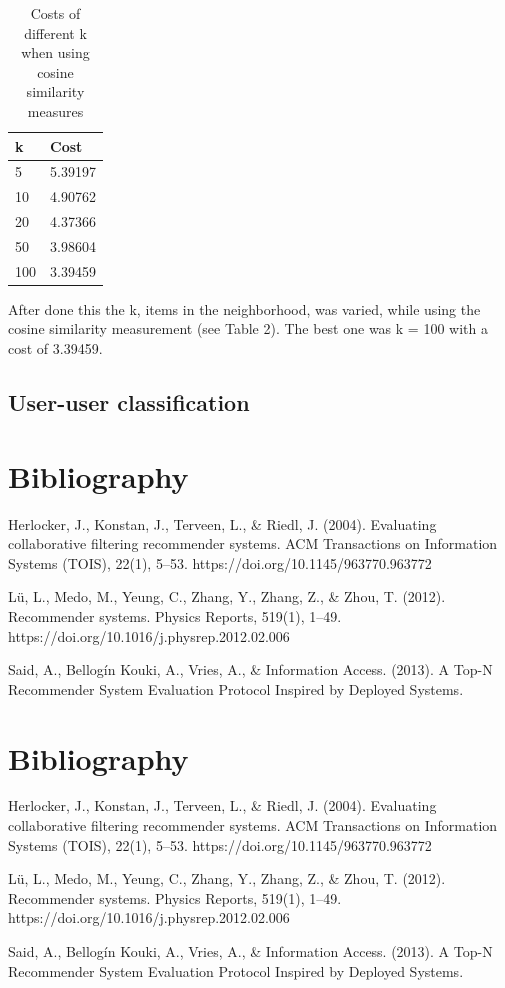 \documentclass[11pt]{article}
\begin{document}
\begin{table}[]
\begin{tabular}{@{}ll@{}}
\toprule
k   & Cost    \\ \midrule
5   & 5.39197 \\
10  & 4.90762 \\
20  & 4.37366 \\
50  & 3.98604 \\
100 & 3.39459 \\ \bottomrule
\end{tabular}
\caption{Costs of different k when using cosine similarity measures}
\end{table}

After done this the k, items in the neighborhood, was varied, while using the cosine similarity measurement (see Table 2). The best one was k = 100 with a cost of 3.39459.

\subsection{User-user classification}




\section{Bibliography}
Herlocker, J., Konstan, J., Terveen, L., & Riedl, J. (2004). Evaluating collaborative filtering recommender systems. ACM Transactions on Information Systems (TOIS), 22(1), 5–53. https://doi.org/10.1145/963770.963772

Lü, L., Medo, M., Yeung, C., Zhang, Y., Zhang, Z., & Zhou, T. (2012). Recommender systems. Physics Reports, 519(1), 1–49. https://doi.org/10.1016/j.physrep.2012.02.006

Said, A., Bellogín Kouki, A., Vries, A., & Information Access. (2013). A Top-N Recommender System Evaluation Protocol Inspired by Deployed Systems.
\section{Bibliography}
Herlocker, J., Konstan, J., Terveen, L., & Riedl, J. (2004). Evaluating collaborative filtering recommender systems. ACM Transactions on Information Systems (TOIS), 22(1), 5–53. https://doi.org/10.1145/963770.963772

Lü, L., Medo, M., Yeung, C., Zhang, Y., Zhang, Z., & Zhou, T. (2012). Recommender systems. Physics Reports, 519(1), 1–49. https://doi.org/10.1016/j.physrep.2012.02.006

Said, A., Bellogín Kouki, A., Vries, A., & Information Access. (2013). A Top-N Recommender System Evaluation Protocol Inspired by Deployed Systems.
\end{document}
